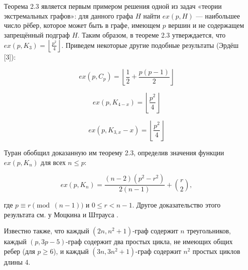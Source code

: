 Теорема 2.3 является первым примером решения одной из задач «теории экстремальных графов»: для данного графа $H$ найти $ex(p, H)$ --- наибольшее число рёбер, которое может быть в графе, имеющем $p$ вершин и не содержащем запрещённый подграф $H$. Таким образом, в теореме 2.3 утверждается, что $ex(p, K_3) = \left\lfloor \frac{p^2}{4} \right\rfloor$. Приведем некоторые другие подобные результаты (Эрдёш [3]):

\begin{equation}
ex(p, C_p) = \left\lfloor \frac{1}{2} + \frac{p(p-1)}{2} \right\rfloor
\end{equation}

\begin{equation}
ex(p, K_{4-x}) = \left\lfloor \frac{p^2}{4} \right\rfloor
\end{equation}

\begin{equation}
ex(p, K_{3, x} - x) = \left\lfloor \frac{p^2}{4} \right\rfloor
\end{equation}

Туран \cite{1} обобщил доказанную им теорему 2.3, определив значения функции $ex(p, K_n)$ для всех $n \leq p$:

\[
ex(p, K_n) = \frac{(n-2)(p^2 - r^2)}{2(n-1)} + \binom{r}{2},
\]

где $p \equiv r \pmod{(n-1)}$ и $0 \leq r < n-1$. Другое доказательство этого результата см. у Моцкина и Штрауса \cite{11}.

Известно также, что каждый $(2n, n^2+1)$-граф содержит $n$ треугольников, каждый $(p, 3p-5)$-граф содержит два простых цикла, не имеющих общих ребер (для $p \geq 6$), и каждый $(3n, 3n^2+1)$-граф содержит $n^2$ простых циклов длины 4.
